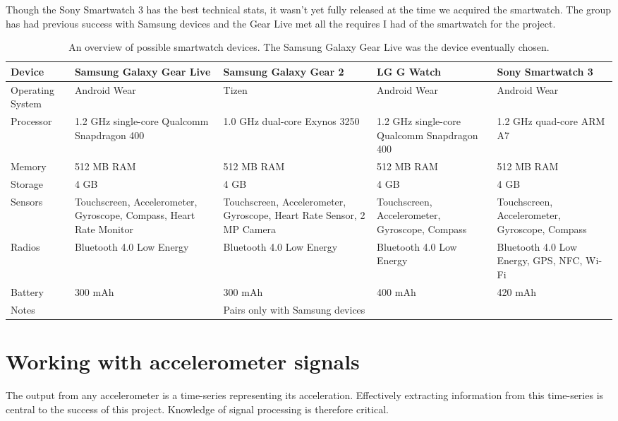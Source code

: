       Though the Sony Smartwatch 3 has the best technical stats, it wasn't yet fully released at the time we acquired the smartwatch. The group has had previous success with Samsung devices and the Gear Live met all the requires I had of the smartwatch for the project.
      \begin{table}
        \centering
        {\tabulinesep=1.2mm
        \begin{tabu} to 
          Device & \textbf{Samsung Galaxy Gear Live} & \textbf{Samsung Galaxy Gear 2} &\textbf{ LG G Watch} & \textbf{Sony Smartwatch 3} \\
          \hline
          Operating System & Android Wear & Tizen & Android Wear & Android Wear \\
          \hline
          Processor & 1.2 GHz single-core Qualcomm Snapdragon 400 & 1.0 GHz dual-core Exynos 3250 & 1.2 GHz single-core Qualcomm Snapdragon 400 & 1.2 GHz quad-core ARM A7 \\
          \hline
          Memory & 512 MB RAM & 512 MB RAM & 512 MB RAM & 512 MB RAM \\
          \hline
          Storage & 4 GB & 4 GB & 4 GB & 4 GB \\
          \hline
          Sensors & Touchscreen, Accelerometer, Gyroscope, Compass, Heart Rate Monitor & Touchscreen, Accelerometer, Gyroscope, Heart Rate Sensor, 2 MP Camera & Touchscreen, Accelerometer, Gyroscope, Compass & Touchscreen, Accelerometer, Gyroscope, Compass \\
          \hline
          Radios & Bluetooth 4.0 Low Energy & Bluetooth 4.0 Low Energy & Bluetooth 4.0 Low Energy & Bluetooth 4.0 Low Energy, GPS, NFC, Wi-Fi \\
          \hline
          Battery & 300 mAh & 300 mAh & 400 mAh & 420 mAh \\
          \hline
          Notes &  & Pairs only with Samsung devices &  & \\
          \hline
          
        \end{tabu}}
        \caption[An overview of possible smartwatch devices]{An overview of possible smartwatch devices. The Samsung Galaxy Gear Live was the device eventually chosen.}
        \label{tab:smartwatch-features}
      \end{table}
  
  \section{Working with accelerometer signals}
    \label{sec:intro-sig-processing}
    The output from any accelerometer is a time-series representing its acceleration. Effectively extracting information from this time-series is central to the success of this project. Knowledge of signal processing is therefore critical.
    
